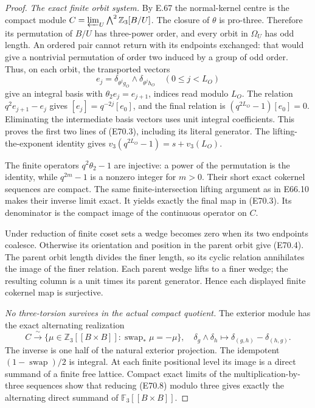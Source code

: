\begin{proof}
\emph{The exact finite orbit system.}
By E.67 the normal-kernel centre is the compact
module
$C=\varprojlim_U\bigwedge^2\mathbb Z_3[B/U]$.
The closure of $\theta$ is pro-three. Therefore its
permutation of $B/U$ has three-power order, and every
orbit in $\Omega_U$ has odd length.
An ordered pair cannot return with its endpoints
exchanged: that would give a nontrivial permutation
of order two induced by a group of odd order.
Thus, on each orbit, the transported vectors
\[
       e_j=\delta_{\theta^jg_O}\wedge
                     \delta_{\theta^jh_O}
                   \quad(0\le j<L_O)
\]
give an integral basis with
$\theta_2e_j=e_{j+1}$, indices read modulo $L_O$.
The relation $q^2e_{j+1}-e_j$ gives
$[e_j]=q^{-2j}[e_0]$, and the final relation is
$(q^{2L_O}-1)[e_0]=0$.
Eliminating the intermediate basis vectors uses
unit integral coefficients. This proves the first
two lines of (E70.3), including its literal generator.
The lifting-the-exponent identity gives
$v_3(q^{2L_O}-1)=s+v_3(L_O)$.

The finite operators $q^2\theta_2-1$ are injective:
a power of the permutation is the identity, while
$q^{2m}-1$ is a nonzero integer for $m>0$.
Their short exact cokernel sequences are compact.
The same finite-intersection lifting argument as
in E66.10 makes their inverse limit exact.
It yields exactly the final map in (E70.3).
Its denominator is the compact image of the
continuous operator on $C$.

Under reduction of finite coset sets a wedge
becomes zero when its two endpoints coalesce.
Otherwise its orientation and position in the
parent orbit give (E70.4). The parent orbit
length divides the finer length, so its cyclic
relation annihilates the image of the finer
relation. Each parent wedge lifts to a finer
wedge; the resulting column is a unit times its
parent generator. Hence each displayed finite
cokernel map is surjective.

\emph{No three-torsion survives in the actual compact quotient.}
The exterior module has the exact alternating
realization
\[
 C\xrightarrow{\ \sim\ }
   \{\mu\in\mathbb Z_3[[B\times B]]:
                         \operatorname{swap}_*\mu=-\mu\},
 \quad
 \delta_g\wedge\delta_h\longmapsto
           \delta_{(g,h)}-\delta_{(h,g)}.
 \tag{E70.8}
\]
The inverse is one half of the natural exterior
projection. The idempotent
$(1-\operatorname{swap})/2$ is integral.
At each finite positional level its image is a
direct summand of a finite free lattice.
Compact exact limits of the multiplication-by-three
sequences show that reducing (E70.8) modulo three
gives exactly the alternating direct summand of
$\mathbb F_3[[B\times B]]$.


\end{proof}
